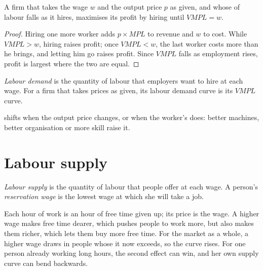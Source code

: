\begin{proposition}\label{prop:g11:labour-market:hiring}
A firm that takes the wage $w$ and the output price $p$ as given, and whose  of labour falls as it hires, maximises its profit by hiring until
$\mathit{VMPL} = w$.
\end{proposition}
\begin{proof}
Hiring one more worker adds $p \times \mathit{MPL}$ to revenue and $w$ to cost. While $\mathit{VMPL} > w$, hiring raises profit; once $\mathit{VMPL} < w$, the last worker
costs more than he brings, and letting him go raises profit. Since $\mathit{VMPL}$ falls as employment rises, profit is largest where the two are equal.
\end{proof}

\begin{definition}\label{def:g11:labour-market:labour-demand}
\emph{Labour demand} is the quantity of labour that employers want to hire at each wage. For a firm that takes prices as given, its labour demand
curve is its $\mathit{VMPL}$ curve.
\end{definition}

 shifts when the output price changes, or when the worker's  does: better machines, better organisation or more skill raise it.

\section{Labour supply}\label{sec:g11:labour-market:supply}

\begin{definition}\label{def:g11:labour-market:labour-supply}
\emph{Labour supply} is the quantity of labour that people offer at each wage. A person's \emph{reservation wage}\label{def:g11:labour-market:reservation-wage} is the lowest wage at which she will take a job.
\end{definition}

Each hour of work is an hour of free time given up; its price is the wage. A higher wage makes free time dearer, which pushes people to work more, but also makes them
richer, which lets them buy more free time. For the market as a whole, a higher wage draws in people whose  it now exceeds, so the  curve
rises. For one person already working long hours, the second effect can win, and her own supply curve can bend backwards.

